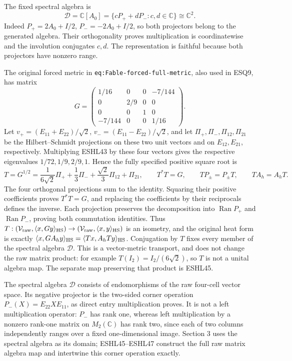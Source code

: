\documentclass[
  10pt,
  a4paper,
]{article}
\begin{document}
The fixed spectral algebra is \[
\mathcal D=\mathbb C[A_0]
=\{cP_++dP_-:c,d\in\mathbb C\}\cong\mathbb C^2.
\tag{ESHL10}
\] Indeed \(P_+=2A_0+I/2\), \(P_-=-2A_0+I/2\), so both projectors belong
to the generated algebra. Their orthogonality proves multiplication is
coordinatewise and the involution conjugates \(c,d\). The representation
is faithful because both projectors have nonzero range.

The original forced metric in \texttt{eq:\allowbreak{}Fable-\allowbreak{}forced-\allowbreak{}full-\allowbreak{}metric}, also
used in ESQ9, has matrix \[
G=\begin{pmatrix}
1/16&0&0&-7/144\\
0&2/9&0&0\\
0&0&1&0\\
-7/144&0&0&1/16
\end{pmatrix}.
\tag{ESHL43}
\] Let \(v_+=(E_{11}+E_{22})/\sqrt2\), \(v_-=(E_{11}-E_{22})/\sqrt2\),
and let \(\Pi_+,\Pi_-,\Pi_{12},\Pi_{21}\) be the Hilbert--Schmidt
projections on these two unit vectors and on \(E_{12},E_{21}\),
respectively. Multiplying ESHL43 by these four vectors gives the
respective eigenvalues \(1/72,1/9,2/9,1\). Hence the fully specified
positive square root is \[
T=G^{1/2}=\frac1{6\sqrt2}\Pi_++\frac13\Pi_-
 +\frac{\sqrt2}{3}\Pi_{12}+\Pi_{21},\qquad
T^*T=G,\qquad TP_\pm=P_\pm T,\qquad TA_h=A_hT.
\tag{ESHL44}
\] The four orthogonal projections sum to the identity. Squaring their
positive coefficients proves \(T^*T=G\), and replacing the coefficients
by their reciprocals defines the inverse. Each projection preserves the
decomposition into \(\operatorname{Ran}P_+\) and
\(\operatorname{Ran}P_-\), proving both commutation identities. Thus
\(T:(\mathcal V_{\rm raw},\langle x,Gy\rangle_{\rm HS})\to(\mathcal V_{\rm raw},\langle x,y\rangle_{\rm HS})\)
is an isometry, and the original heat form is exactly
\(\langle x,GA_hy\rangle_{\rm HS}=\langle Tx,A_hTy\rangle_{\rm HS}\).
Conjugation by \(T\) fixes every member of the spectral algebra
\(\mathcal D\). This is a vector-metric transport, and does not change
the raw matrix product: for example \(T(I_2)=I_2/(6\sqrt2)\), so \(T\)
is not a unital algebra map. The separate map preserving that product is
ESHL45.

The spectral algebra \(\mathcal D\) consists of endomorphisms of the raw
four-cell vector space. Its negative projector is the two-sided corner
operation \(P_-(X)=E_{22}XE_{11}\), as direct entry multiplication
proves. It is not a left multiplication operator: \(P_-\) has rank one,
whereas left multiplication by a nonzero rank-one matrix on
\(M_2(\mathbb C)\) has rank two, since each of two columns independently
ranges over a fixed one-dimensional image. Section 3 uses the spectral
algebra as its domain; ESHL45--ESHL47 construct the full raw matrix
algebra map and intertwine this corner operation exactly.
\end{document}
